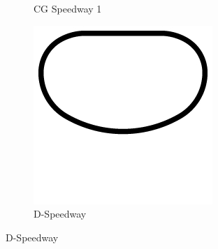 \begin{figure}
\begin{subfigure}[b]{0.2\textwidth}
       \caption{CG Speedway 1}
   \end{subfigure}
\begin{subfigure}[b]{0.2\textwidth}
       \includegraphics[width=\textwidth]{img/tracks/D-Speedway}
       \caption{D-Speedway}
   \end{subfigure}


\end{figure}
